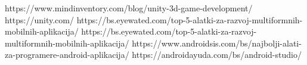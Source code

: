 \documentclass[12pt]{article}
\begin{document}
\pagebreak
\begin{thebibliography}{}
https://www.mindinventory.com/blog/unity-3d-game-development/
https://unity.com/
https://bs.eyewated.com/top-5-alatki-za-razvoj-multiformnih-mobilnih-aplikacija/
 https://bs.eyewated.com/top-5-alatki-za-razvoj-multiformnih-mobilnih-aplikacija/
https://www.androidsis.com/bs/najbolji-alati-za-programere-android-aplikacija/
https://androidayuda.com/bs/android-studio/
\end{thebibliography}
\end{document}
